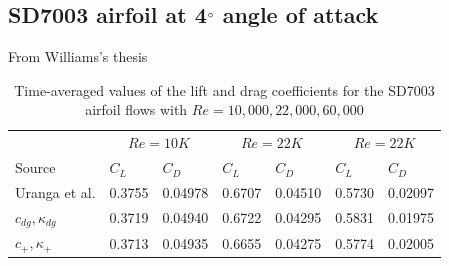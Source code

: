 \graphicspath{{figures_SD7003/}}%

\subsection{SD7003 airfoil at 4$^{\circ}$ angle of attack}
From Williams's thesis\cite{williams2013thesis}

\begin{table}[htbp]
\centering
\begin{tabular}{ l| l l| l l| l l} 
  
 &  \multicolumn{2}{|c|}{$Re = 10K$}  & \multicolumn{2}{|c|}{$Re = 22K$} & \multicolumn{2}{|c}{$Re = 22K$}  \\ 
 Source & $C_L$ & $C_D$ & $C_L$ & $C_D$ & $C_L$ & $C_D$   \\ 
\hline
 Uranga et al.\cite{uranga2011implicit} & 0.3755 & 0.04978 & 0.6707 & 0.04510 & 0.5730 & 0.02097  \\ 
$c_{dg},\kappa_{dg}$ & 0.3719 & 0.04940 & 0.6722 & 0.04295 & 0.5831 & 0.01975 \\ 
$c_{+},\kappa_{+}$ & 0.3713 & 0.04935 & 0.6655 & 0.04275 & 0.5774 & 0.02005  \\ 
 \end{tabular}
\caption{Time-averaged values of the lift and drag coefficients for the SD7003 airfoil flows with $Re = 10,000, 22,000, 60,000$}
\label{table:sdAirfoilForce} 
 \end{table}

